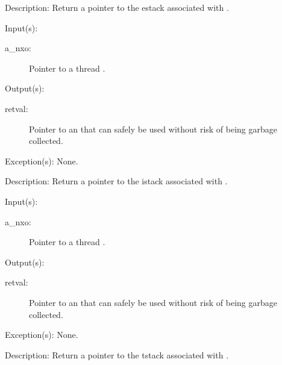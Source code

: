 \begin{capi}
\begin{capilist}
	\item[Description: ]
		Return a pointer to the estack associated with .
	\end{capilist}
\label{nxo_thread_istack_get}
	\begin{capilist}
	\item[Input(s): ]
		\begin{description}\item[]
		\item[a\_nxo: ]
			Pointer to a thread .
		\end{description}
	\item[Output(s): ]
		\begin{description}\item[]
		\item[retval: ]
			Pointer to an  that can safely be used
			without risk of being garbage collected.
		\end{description}
	\item[Exception(s): ] None.
	\item[Description: ]
		Return a pointer to the istack associated with .
	\end{capilist}
\label{nxo_thread_tstack_get}
	\begin{capilist}
	\item[Input(s): ]
		\begin{description}\item[]
		\item[a\_nxo: ]
			Pointer to a thread \classname{nxo}.
		\end{description}
	\item[Output(s): ]
		\begin{description}\item[]
		\item[retval: ]
			Pointer to an  that can safely be used
			without risk of being garbage collected.
		\end{description}
	\item[Exception(s): ] None.
	\item[Description: ]
		Return a pointer to the tstack associated with \cvar{a\_nxo}.
	\end{capilist}
\label{nxo_thread_stdin_get}

\end{capi}

